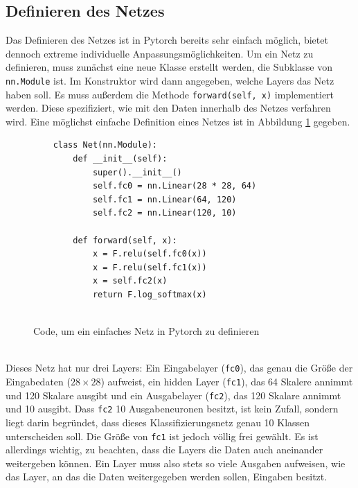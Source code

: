 \documentclass[11pt]{article}
\begin{document}
\subsection{Definieren des Netzes}
Das Definieren des Netzes ist in Pytorch bereits sehr einfach möglich, bietet dennoch extreme individuelle Anpassungsmöglichkeiten. Um ein Netz zu definieren, muss zunächst eine neue Klasse erstellt werden, die Subklasse von \texttt{nn.Module} ist. Im Konstruktor wird dann angegeben, welche Layers das Netz haben soll. Es muss außerdem die Methode \texttt{forward(self, x)} implementiert werden. Diese spezifiziert, wie mit den Daten innerhalb des Netzes verfahren wird. Eine möglichst einfache Definition  eines Netzes ist in Abbildung \ref{Net_simple_definition} gegeben.
\begin{figure}[h]
	\begin{verbatim}
	class Net(nn.Module):
		def __init__(self):
			super().__init__()
			self.fc0 = nn.Linear(28 * 28, 64)
			self.fc1 = nn.Linear(64, 120)
			self.fc2 = nn.Linear(120, 10)
	
		def forward(self, x):
			x = F.relu(self.fc0(x))
			x = F.relu(self.fc1(x))
			x = self.fc2(x)
			return F.log_softmax(x)
	
	\end{verbatim}
	\caption{Code, um ein einfaches Netz in Pytorch zu definieren}
	\label{Net_simple_definition}
\end{figure}\\
Dieses Netz hat nur drei Layers: Ein Eingabelayer (\texttt{fc0}), das genau die Größe der Eingabedaten ($28\times28$) aufweist, ein hidden Layer (\texttt{fc1}), das 64 Skalere annimmt und 120 Skalare ausgibt und ein Ausgabelayer (\texttt{fc2}), das 120 Skalare annimmt und 10 ausgibt. Dass \texttt{fc2} 10 Ausgabeneuronen besitzt, ist kein Zufall, sondern liegt darin begründet, dass dieses Klassifizierungsnetz genau 10 Klassen unterscheiden soll. Die Größe von \texttt{fc1} ist jedoch völlig frei gewählt. Es ist allerdings wichtig, zu beachten, dass die Layers die Daten auch aneinander weitergeben können. Ein Layer muss also stets so viele Ausgaben aufweisen, wie das Layer, an das die Daten weitergegeben werden sollen, Eingaben besitzt.\\
\end{document}

